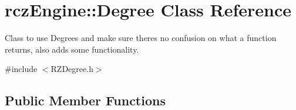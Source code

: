 \hypertarget{classrcz_engine_1_1_degree}{}\section{rcz\+Engine\+:\+:Degree Class Reference}
\label{classrcz_engine_1_1_degree}


Class to use Degrees and make sure there\textquotesingle{}s no confusion on what a function returns, also adds some functionality.  




{\ttfamily \#include $<$R\+Z\+Degree.\+h$>$}

\subsection*{Public Member Functions}
